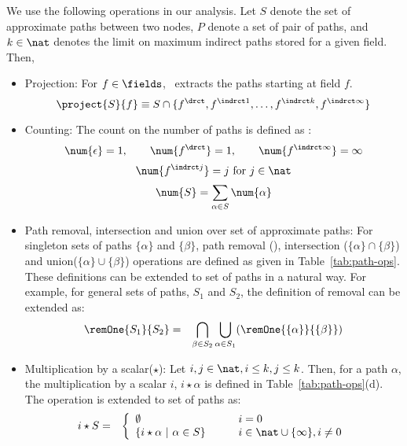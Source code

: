 We use the following operations in our analysis. Let $S$
denote the set of approximate paths between two nodes, $P$
denote a set of pair of paths, and $k \in \nat$ denotes the
limit on maximum indirect paths stored for a given
field. Then,
\begin{itemize}\is
\item      Projection:     For      $f      \in     \fields$,
  \ extracts the paths starting at field $f$.
  $$\project{S}{f} \equiv S \cap \{f^{\drct}, f^{\indrct 1}, \ldots,
  f^{\indrct k}, f^{\indrct \infty}\}$$

\item Counting: The  count on the number of  paths is defined
  as :
  $$\num{\epsilon} = 1, \qquad   \num{f^{\drct}} = 1,
  \qquad   \num{f^{\indrct\infty}} =     \infty $$
  $$\num{f^{\indrct j}} =  j \mbox{ for } j \in \nat$$
  $$\num{S} =   \sum_{\alpha \in S}\num{\alpha}$$

\item  Path  removal,  intersection  and union  over  set  of
  approximate paths: For singleton sets of paths $\{\alpha\}$
  and           $\{\beta\}$,           path           removal
  (\remOne{\{\alpha\}}{\{\beta\}}), intersection ($\{\alpha\}
  \cap  \{\beta\}$)  and  union($\{\alpha\} \cup  \{\beta\}$)
  operations      are      defined      as      given      in
  Table~\ref{tab:path-ops}. These definitions can be extended
  to set of paths in  a natural way. For example, for general
  sets of  paths, $S_1$ and $S_2$, the  definition of removal
  can be extended as:
  \begin{eqnarray*}
    \remOne{S_1}{S_2} &=&
    \bigcap_{\beta \in {S_2}} \bigcup_{\alpha \in {S_1}}
        (\remOne{\{\alpha\}}{\{\beta\}})
  \end{eqnarray*}

	

\item Multiplication by a scalar($\star$): Let $i, j
  \in \nat, i \leq k, j \leq k$. Then, for a path $\alpha$,
  the multiplication by a scalar $i$, $i\star\alpha$ is
  defined in Table~\ref{tab:path-ops}(d). The operation is
  extended to set of paths as:
\begin{eqnarray*}
  i \star {S} &=&   \left\{ \begin{array}{lcl}
    \emptyset &\quad& i = 0 \\
    \{ i\star \alpha \ \vert\ \alpha \in S\} &\quad& i\in
    \nat \cup \{\infty\}, i \not= 0
  \end{array} \right.
\end{eqnarray*}


\end{itemize}
